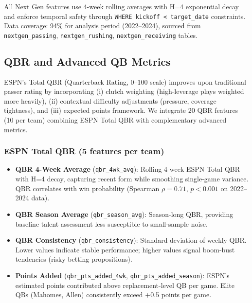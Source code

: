 All Next Gen features use 4-week rolling averages with H=4 exponential decay and enforce temporal safety through \texttt{WHERE kickoff < target\_date} constraints. Data coverage: 94\% for analysis period (2022--2024), sourced from \texttt{nextgen\_passing}, \texttt{nextgen\_rushing}, \texttt{nextgen\_receiving} tables.

\subsection{QBR and Advanced QB Metrics}
\label{subsec:qbr-features}

ESPN's Total QBR (Quarterback Rating, 0--100 scale) improves upon traditional passer rating by incorporating (i) clutch weighting (high-leverage plays weighted more heavily), (ii) contextual difficulty adjustments (pressure, coverage tightness), and (iii) expected points framework. We integrate 20 QBR features (10 per team) combining ESPN Total QBR with complementary advanced metrics.

\subsubsection{ESPN Total QBR (5 features per team)}

\begin{itemize}
  \item \textbf{QBR 4-Week Average} (\texttt{qbr\_4wk\_avg}): Rolling 4-week ESPN Total QBR with H=4 decay, capturing recent form while smoothing single-game variance. QBR correlates with win probability (Spearman $\rho = 0.71$, $p < 0.001$ on 2022--2024 data).

  \item \textbf{QBR Season Average} (\texttt{qbr\_season\_avg}): Season-long QBR, providing baseline talent assessment less susceptible to small-sample noise.

  \item \textbf{QBR Consistency} (\texttt{qbr\_consistency}): Standard deviation of weekly QBR. Lower values indicate stable performance; higher values signal boom-bust tendencies (risky betting propositions).

  \item \textbf{Points Added} (\texttt{qbr\_pts\_added\_4wk}, \texttt{qbr\_pts\_added\_season}): ESPN's estimated points contributed above replacement-level QB per game. Elite QBs (Mahomes, Allen) consistently exceed +0.5 points per game.
\end{itemize}

